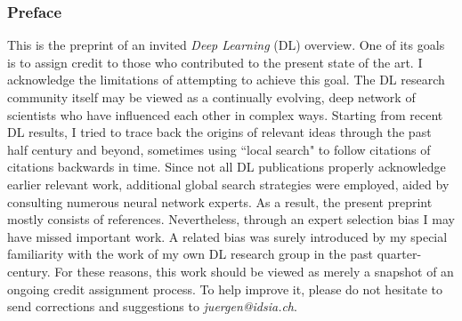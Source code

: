 \documentclass[letterpaper]{article}
\begin{document}
\vspace{1cm}
\subsubsection*{Preface}
\label{foreword}
This is the preprint of an invited {\em Deep Learning} (DL) overview. One of its goals is to assign credit to those who contributed to the present state of the art. I acknowledge the limitations of attempting to achieve this goal. The DL research community itself may be viewed as a continually evolving, deep network of scientists who have influenced each other in complex ways. Starting from recent DL results, I tried to trace back the origins of relevant ideas through the past half century and beyond, sometimes using ``local search" to follow citations of citations  backwards in time. Since not all DL publications properly acknowledge earlier relevant work, additional global search strategies were employed, aided by consulting numerous neural network experts. As a result, the present preprint mostly consists of references. Nevertheless, through an expert selection bias I may have missed important work. A related bias was surely introduced by my special familiarity with the work of my own DL research group in the past quarter-century. For these reasons, this work should be viewed as merely a snapshot of an ongoing credit assignment process. To help improve it, please do not hesitate to send corrections and  suggestions to {\em juergen@idsia.ch}.




\newpage
\tableofcontents
\end{document}
